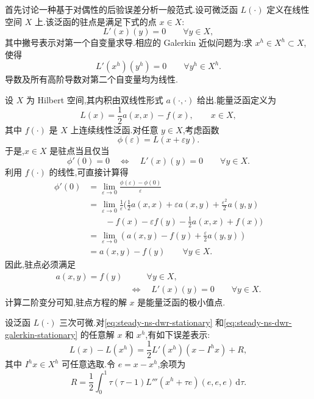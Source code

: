 \begin{note}[抽象框架]\label{note:steady-ns-dwr-abstract-setting}
首先讨论一种基于对偶性的后验误差分析一般范式.设可微泛函 $L(\cdot)$ 定义在线性空间 $X$ 上.该泛函的驻点是满足下式的点 $x\in X$:
\begin{equation}\label{eq:steady-ns-dwr-stationary}
  L'(x)(y)=0\qquad \forall y\in X,
\end{equation}
其中撇号表示对第一个自变量求导.相应的 Galerkin 近似问题为:求 $x^h\in X^h\subset X$,使得
\begin{equation}\label{eq:steady-ns-dwr-galerkin-stationary}
  L'(x^h)(y^h)=0\qquad \forall y^h\in X^h.
\end{equation}
导数及所有高阶导数对第二个自变量均为线性.
\end{note}

\begin{example}[能量泛函]\label{ex:steady-ns-dwr-energy-functional}
设 $X$ 为 Hilbert 空间,其内积由双线性形式 $a(\cdot,\cdot)$ 给出.能量泛函定义为
\[
  L(x)=\frac12 a(x,x)-f(x),\qquad x\in X,
\]
其中 $f(\cdot)$ 是 $X$ 上连续线性泛函.对任意 $y\in X$,考虑函数
\[
  \phi(\varepsilon)=L(x+\varepsilon y).
\]
于是,$x\in X$ 是驻点当且仅当
\[
  \phi'(0)=0\quad\Longleftrightarrow\quad
  L'(x)(y)=0\qquad \forall y\in X.
\]
利用 $f(\cdot)$ 的线性,可直接计算得
\begin{align*}
  \phi'(0)
    &=\lim_{\varepsilon\to0}
      \frac{\phi(\varepsilon)-\phi(0)}{\varepsilon}\\
    &=\lim_{\varepsilon\to0}\frac{1}{\varepsilon}\Biggl(
      \frac12a(x,x)+\varepsilon a(x,y)+\frac{\varepsilon^2}{2}a(y,y)\\
    &\qquad-f(x)-\varepsilon f(y)-\frac12a(x,x)+f(x)\Biggr)\\
    &=\lim_{\varepsilon\to0}\left(a(x,y)-f(y)
      +\frac{\varepsilon}{2}a(y,y)\right)\\
    &=a(x,y)-f(y)\qquad \forall y\in X.
\end{align*}
因此,驻点必须满足
\[
\begin{aligned}
  a(x,y)=f(y)&\qquad \forall y\in X,\\
  &\Longleftrightarrow\quad L'(x)(y)=0\qquad \forall y\in X.
\end{aligned}
\]
计算二阶变分可知,驻点方程的解 $x$ 是能量泛函的极小值点.
\end{example}

\begin{lemma}[抽象误差表示]\label{lem:steady-ns-dwr-abstract-error}
设泛函 $L(\cdot)$ 三次可微.对\cref{eq:steady-ns-dwr-stationary} 和\cref{eq:steady-ns-dwr-galerkin-stationary} 的任意解 $x$ 和 $x^h$,有如下误差表示:
\begin{equation}\label{eq:steady-ns-dwr-abstract-representation}
  L(x)-L(x^h)
  =\frac12L'(x^h)(x-I^h x)+R,
\end{equation}
其中 $I^h x\in X^h$ 可任意选取.令 $e=x-x^h$,余项为
\begin{equation}\label{eq:steady-ns-dwr-abstract-remainder}
  R=\frac12\int_0^1\tau(\tau-1)
  L'''(x^h+\tau e)(e,e,e)\,\mathrm{d}\tau.
\end{equation}
\end{lemma}

